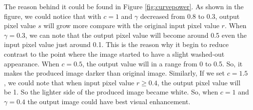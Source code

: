The reason behind it could be found in Figure \ref{fig:curvepower}. As shown in the figure, we could notice that with $c = 1$ and $\gamma$ decreased from 0.8 to 0.3, output pixel value $s$ will grow more compare with the original input pixel value $r$. When $\gamma=0.3$, we can note that the output pixel value will become around 0.5 even the input pixel value just around 0.1. This is the reason why it begin to reduce contrast to the point where the image started to have a slight washed-out appearance. When $c = 0.5$, the output value will in a range from 0 to 0.5. So, it makes the produced image darker than original image. Similarly, If we set $c = 1.5$, we could note that when input pixel value $r \geq 0.4$, the output pixel value will be 1. So the lighter side of the produced image became white. So, when $c = 1$ and $\gamma = 0.4$ the output image could have best visual enhancement.


